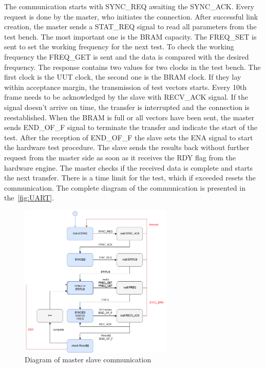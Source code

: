 The communication starts with SYNC\_REQ awaiting the SYNC\_ACK. Every request is done by the master, who initiates the connection. After successful link creation, the master sends a STAT\_REQ signal to read all parameters from the test bench. The most important one is the BRAM capacity. The FREQ\_SET is sent to set the working frequency for the next test. To check the working frequency the FREQ\_GET is sent and the data is compared with the desired frequency. The response contains two values for two clocks in the test bench. The first clock is the UUT clock, the second one is the BRAM clock. If they lay within acceptance margin, the transmission of test vectors starts. Every 10th frame needs to be acknowledged by the slave with RECV\_ACK signal. If the signal doesn't arrive on time, the transfer is interrupted and the connection is reestablished. When the BRAM is full or all vectors have been sent, the master sends END\_OF\_F signal to terminate the transfer and indicate the start of the test. After the reception of END\_OF\_F the slave sets the ENA signal to start the hardware test procedure. The slave sends the results back without further request from the master side as soon as it receives the RDY flag from the hardware engine. The master checks if the received data is complete and starts the next transfer. There is a time limit for the test, which if exceeded resets the communication. The complete diagram of the communication is presented in the~\autoref{fig:UART}.

\begin{figure}[H]
\centering
\includegraphics[width=0.65\textwidth]{figures/UART.png}
\caption{Diagram of master slave communication}
\label{fig:UART}
\end{figure}

